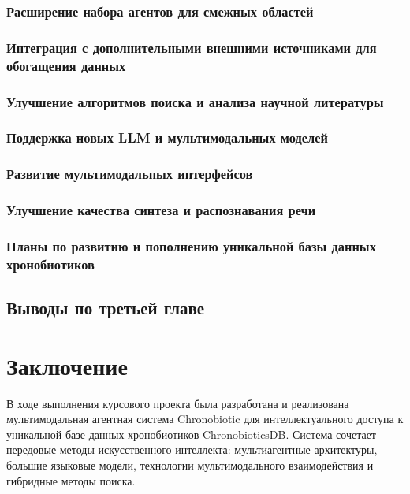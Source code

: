 \documentclass{syksu-coursework}
\begin{document}
\subsubsection{Расширение набора агентов для смежных областей}

\subsubsection{Интеграция с дополнительными внешними источниками для обогащения данных}

\subsubsection{Улучшение алгоритмов поиска и анализа научной литературы}

\subsubsection{Поддержка новых LLM и мультимодальных моделей}

\subsubsection{Развитие мультимодальных интерфейсов}

\subsubsection{Улучшение качества синтеза и распознавания речи}

\subsubsection{Планы по развитию и пополнению уникальной базы данных хронобиотиков}

\subsection*{Выводы по третьей главе}

\newpage

\section*{Заключение}

В ходе выполнения курсового проекта была разработана и реализована мультимодальная агентная система Chronobiotic для интеллектуального доступа к уникальной базе данных хронобиотиков ChronobioticsDB. Система сочетает передовые методы искусственного интеллекта: мультиагентные архитектуры, большие языковые модели, технологии мультимодального взаимодействия и гибридные методы поиска.
\end{document}
